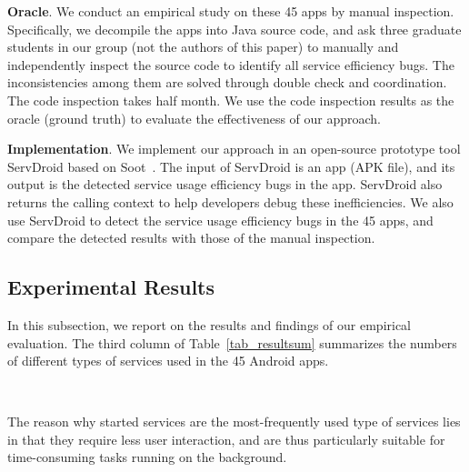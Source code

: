 \documentclass[conference]{IEEEtran}
\begin{document}
\textbf{Oracle}. We conduct an empirical study on these 45 apps by manual inspection. Specifically, we decompile the apps into Java source code, and ask three graduate
students in our group (not the authors of this paper) to manually and independently inspect the source code to identify all service efficiency bugs. The inconsistencies among them are solved through double check and coordination. The code inspection takes half month. We use the code inspection results as the oracle (ground truth) to evaluate the effectiveness of our approach.

\textbf{Implementation}. We implement our approach in an open-source prototype tool {\sf ServDroid} based on {\sf Soot}~\cite{sootpaper}. The input of {\sf ServDroid} is an app (APK file), and its output is the detected service usage efficiency bugs in the app. {\sf ServDroid} also returns the calling context to help developers debug these inefficiencies. We also use {\sf ServDroid} to detect the service usage efficiency bugs in the 45 apps, and compare the detected results with those of the manual inspection.

\subsection{Experimental Results}
In this subsection, we report on the results and findings of our empirical evaluation. The third column of Table~\ref{tab_resultsum} summarizes the numbers of different types of services used in the 45 Android apps.

\medskip
{\setlength{\parindent}{0 em}
}\\
\medskip

The reason why started services are the most-frequently used type of services lies in that they require less user interaction, and are thus particularly suitable for time-consuming tasks running on the background.
\end{document}
